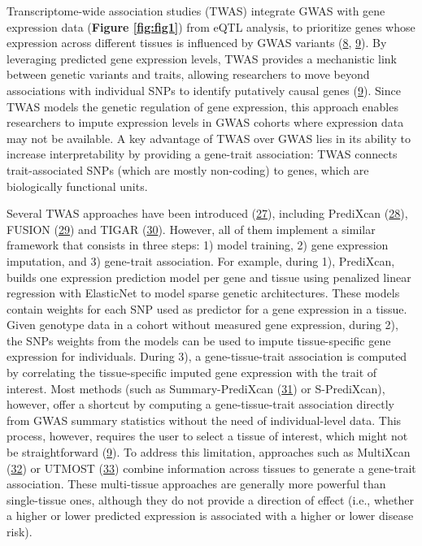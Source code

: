 Transcriptome-wide association studies (TWAS) integrate GWAS with gene expression data (\textbf{Figure \ref{fig:fig1}}) from eQTL analysis, to prioritize genes whose expression across different tissues is influenced by GWAS variants (\protect\hyperlink{ref-ReOPt75u}{8}, \protect\hyperlink{ref-l6ogswV3}{9}).
By leveraging predicted gene expression levels, TWAS provides a mechanistic link between genetic variants and traits, allowing researchers to move beyond associations with individual SNPs to identify putatively causal genes (\protect\hyperlink{ref-l6ogswV3}{9}).
Since TWAS models the genetic regulation of gene expression, this approach enables researchers to impute expression levels in GWAS cohorts where expression data may not be available.
A key advantage of TWAS over GWAS lies in its ability to increase interpretability by providing a gene-trait association: TWAS connects trait-associated SNPs (which are mostly non-coding) to genes, which are biologically functional units.

Several TWAS approaches have been introduced (\protect\hyperlink{ref-RmhTH35O}{27}), including PrediXcan (\protect\hyperlink{ref-Z8bvDdVq}{28}), FUSION (\protect\hyperlink{ref-1D63fEEPb}{29}) and TIGAR (\protect\hyperlink{ref-19Klmizj8}{30}).
However, all of them implement a similar framework that consists in three steps: 1) model training, 2) gene expression imputation, and 3) gene-trait association.
For example, during 1), PrediXcan, builds one expression prediction model per gene and tissue using penalized linear regression with ElasticNet to model sparse genetic architectures.
These models contain weights for each SNP used as predictor for a gene expression in a tissue.
Given genotype data in a cohort without measured gene expression, during 2), the SNPs weights from the models can be used to impute tissue-specific gene expression for individuals.
During 3), a gene-tissue-trait association is computed by correlating the tissue-specific imputed gene expression with the trait of interest.
Most methods (such as Summary-PrediXcan (\protect\hyperlink{ref-vLyTudUB}{31}) or S-PrediXcan), however, offer a shortcut by computing a gene-tissue-trait association directly from GWAS summary statistics without the need of individual-level data.
This process, however, requires the user to select a tissue of interest, which might not be straightforward (\protect\hyperlink{ref-l6ogswV3}{9}).
To address this limitation, approaches such as MultiXcan (\protect\hyperlink{ref-1FFzCXo1s}{32}) or UTMOST (\protect\hyperlink{ref-93R9hBin}{33}) combine information across tissues to generate a gene-trait association.
These multi-tissue approaches are generally more powerful than single-tissue ones, although they do not provide a direction of effect (i.e., whether a higher or lower predicted expression is associated with a higher or lower disease risk).

